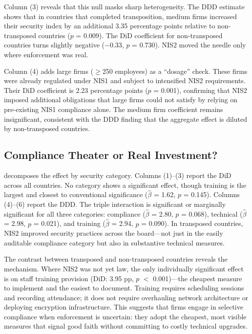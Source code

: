 \documentclass[12pt]{article}
\begin{document}
Column (3) reveals that this null masks sharp heterogeneity. The DDD estimate shows that in countries that completed transposition, medium firms increased their security index by an additional 3.35 percentage points relative to non-transposed countries ($p$ = 0.009). The DiD coefficient for non-transposed countries turns slightly negative ($-$0.33, $p$ = 0.730). NIS2 moved the needle only where enforcement was real.

Column (4) adds large firms ($\geq$250 employees) as a ``dosage'' check. These firms were already regulated under NIS1 and subject to intensified NIS2 requirements. Their DiD coefficient is 2.23 percentage points ($p$ = 0.001), confirming that NIS2 imposed additional obligations that large firms could not satisfy by relying on pre-existing NIS1 compliance alone. The medium firm coefficient remains insignificant, consistent with the DDD finding that the aggregate effect is diluted by non-transposed countries.

\subsection{Compliance Theater or Real Investment?}



 decomposes the effect by security category. Columns (1)--(3) report the DiD across all countries. No category shows a significant effect, though training is the largest and closest to conventional significance ($\hat{\beta}$ = 1.62, $p$ = 0.145). Columns (4)--(6) report the DDD. The triple interaction is significant or marginally significant for all three categories: compliance ($\hat{\beta}$ = 2.80, $p$ = 0.068), technical ($\hat{\beta}$ = 2.98, $p$ = 0.021), and training ($\hat{\beta}$ = 2.94, $p$ = 0.090). In transposed countries, NIS2 improved security practices across the board---not just in the easily auditable compliance category but also in substantive technical measures.

The contrast between transposed and non-transposed countries reveals the mechanism. Where NIS2 was not yet law, the only individually significant effect is on staff training provision (DiD: 3.95 pp, $p$ $<$ 0.001)---the cheapest measure to implement and the easiest to document. Training requires scheduling sessions and recording attendance; it does not require overhauling network architecture or deploying encryption infrastructure. This suggests that firms engage in selective compliance when enforcement is uncertain: they adopt the cheapest, most visible measures that signal good faith without committing to costly technical upgrades.
\end{document}
